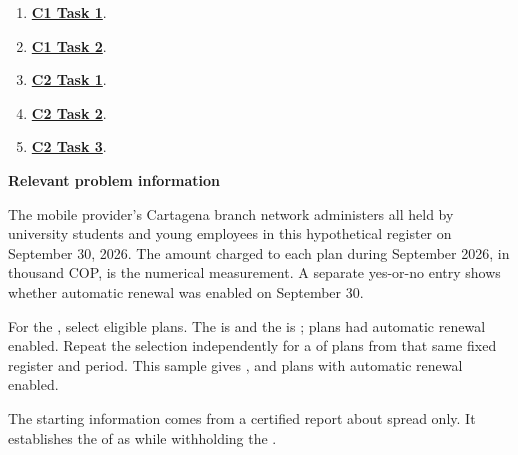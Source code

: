 \begin{enumerate}[label=(\alph*),itemsep=6pt]
\item \hyperref[sol:p2c1a]{\textbf{C1 Task 1}}. \cOneA\ 
\item \hyperref[sol:p2c1b]{\textbf{C1 Task 2}}. \cOneB\ 
\item \hyperref[sol:p2c2a]{\textbf{C2 Task 1}}. \cTwoA\ 
\item \hyperref[sol:p2c2b]{\textbf{C2 Task 2}}. \cTwoB\ 
\item \hyperref[sol:p2c2c]{\textbf{C2 Task 3}}. \cTwoC\ 
\end{enumerate}
\secInicio[][sec:p2]

\clearpage



\textbf{Relevant problem information}

\begin{probleminfoexcerpt}
The mobile provider's Cartagena branch network administers all      held by university students and young employees in this hypothetical register on September 30, 2026. The amount charged to each plan during September 2026, in thousand COP, is the numerical measurement. A separate yes-or-no entry shows whether automatic renewal was enabled on September 30.
\end{probleminfoexcerpt}

\begin{probleminfoexcerpt}
For the    , select  eligible plans. The    is    and the    is   ;  plans had automatic renewal enabled. Repeat the selection independently for a     of  plans from that same fixed register and period. This sample gives     ,       and  plans with automatic renewal enabled.
\end{probleminfoexcerpt}

\begin{probleminfoexcerpt}
The starting information comes from a certified report about spread only. It establishes the    of  as    while withholding the   .
\end{probleminfoexcerpt}

